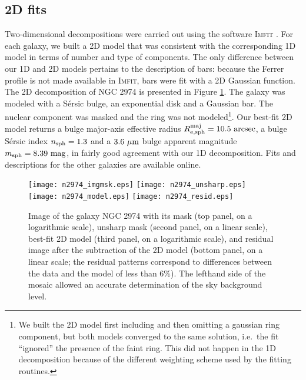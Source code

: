 \documentclass[preprint2]{emulateapj}
\begin{document}
\subsection{2D fits}
\label{sec:2d}
Two-dimensional decompositions were carried out using the software \textsc{Imfit} \citep{imfit}.
For each galaxy, we built a 2D model that was consistent with the corresponding 1D model in terms of number and type of components. 
The only difference between our 1D and 2D models pertains to the description of bars: 
because the Ferrer profile is not made available in \textsc{Imfit},
bars were fit with a 2D Gaussian function.  \\
The 2D decomposition of NGC 2974 is presented in Figure \ref{fig:n29742d}. 
The galaxy was modeled with a S\'ersic bulge, an exponential disk and a Gaussian bar.
The nuclear component was masked and the ring was not 
modeled\footnote{We built the 2D model first including and then omitting a gaussian ring component, 
but both models converged to the same solution, i.e.~the fit ``ignored'' the presence of the faint ring. 
This did not happen in the 1D decomposition because of the different weighting scheme used by the fitting routines.}. 
Our best-fit 2D model returns a bulge major-axis effective radius $R_{\rm e,sph}^{\rm maj} = 10.5~\rm arcsec$, 
a bulge S\'ersic index $n_{\rm sph} = 1.3$ and a $3.6~\rm \mu m$ bulge apparent magnitude $m_{\rm sph} = 8.39~\rm mag$, 
in fairly good agreement with our 1D decomposition. 
Fits and descriptions for the other galaxies are available online.

\begin{figure}[h]
\begin{center}
\texttt{[image: n2974\_imgmsk.eps]}
\texttt{[image: n2974\_unsharp.eps]}
\texttt{[image: n2974\_model.eps]}
\texttt{[image: n2974\_resid.eps]}
\caption{Image of the galaxy NGC 2974 with its mask (top panel, on a logarithmic scale), 
unsharp mask (second panel, on a linear scale), 
best-fit 2D model (third panel, on a logarithmic scale), 
and residual image after the subtraction of the 2D model (bottom panel, on a linear scale; 
the residual patterns correspond to differences between the data and the model of less than 6\%).
The lefthand side of the mosaic allowed an accurate determination of the sky background level.}
\label{fig:n29742d}
\end{center}
\end{figure}
\end{document}
